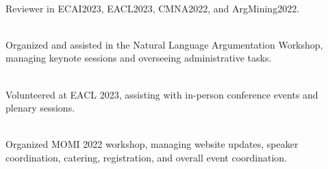 \documentclass[a4paper]{MagicalCV}
\begin{document}
\begin{minipage}[t]{0.60\textwidth}

 \\
\descript{}
\vspace{\topsep} %
Reviewer in ECAI2023, EACL2023, CMNA2022, and ArgMining2022.
\sectionsep

 \\
\vspace{\topsep}
Organized and assisted in the Natural Language Argumentation Workshop, managing keynote sessions and overseeing administrative tasks.
\sectionsep

 \\
\vspace{\topsep}
Volunteered at EACL 2023, assisting with in-person conference events and plenary sessions.
\sectionsep

 \\
\vspace{\topsep} %
Organized MOMI 2022 workshop, managing website updates, speaker coordination, catering, registration, and overall event coordination.
\sectionsep
\end{minipage}

\newpage
\end{document}
